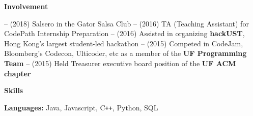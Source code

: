 \documentclass[letterpaper,10pt]{article}
\makeatletter
\newcommand{\resitem}[1]{\item #1 \vspace{-2pt}}
\newcommand{\resheading}[1]{{\large \colorbox{mygrey}{\begin{minipage}{\textwidth}{\textbf{#1 \vphantom{p\^{E}}}}\end{minipage}}}}
\newcommand{\ressubheading}[4]{
\begin{tabular*}{7.0in}{l@{\extracolsep{\fill}}r}
		\textbf{#1} & #2 \\
		\textit{#3} & \textit{#4} \\
\end{tabular*}\vspace{-6pt}}
\makeatother
\begin{document}

\resheading{Involvement}
\newline \newline
-- (2018) Salsero in the Gator Salsa Club\newline
-- (2016) TA (Teaching Assistant) for CodePath Internship Preparation \newline
-- (2016) Assisted in organizing \textbf{hackUST}, Hong Kong's largest student-led hackathon \newline
-- (2015) Competed in CodeJam, Bloomberg's Codecon, Ulticoder, etc as a member of the \textbf{UF Programming Team} \newline
-- (2015) Held Treasurer executive board position of the \textbf{UF ACM chapter}\newline

\resheading{Skills}
\newline\newline
\textbf{Languages:} \tabto{2.5cm} Java, Javascript, C{}\verb!++!, Python, SQL \newline
\end{document}
